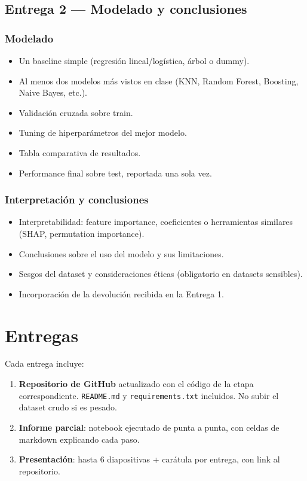 \documentclass[12pt]{article}
\begin{document}
\subsection{Entrega 2 --- Modelado y conclusiones}

\subsubsection{Modelado}

\begin{itemize}
    \item Un baseline simple (regresión lineal/logística, árbol o dummy).
    \item Al menos dos modelos más vistos en clase (KNN, Random Forest, Boosting, Naive Bayes, etc.).
    \item Validación cruzada sobre train.
    \item Tuning de hiperparámetros del mejor modelo.
    \item Tabla comparativa de resultados.
    \item Performance final sobre test, reportada una sola vez.
\end{itemize}

\subsubsection{Interpretación y conclusiones}

\begin{itemize}
    \item Interpretabilidad: feature importance, coeficientes o herramientas similares (SHAP, permutation importance).
    \item Conclusiones sobre el uso del modelo y sus limitaciones.
    \item Sesgos del dataset y consideraciones éticas (obligatorio en datasets sensibles).
    \item Incorporación de la devolución recibida en la Entrega 1.
\end{itemize}

\section{Entregas}

Cada entrega incluye:

\begin{enumerate}
    \item \textbf{Repositorio de GitHub} actualizado con el código de la etapa correspondiente. \texttt{README.md} y \texttt{requirements.txt} incluidos. No subir el dataset crudo si es pesado.
    \item \textbf{Informe parcial}: notebook ejecutado de punta a punta, con celdas de markdown explicando cada paso.
    \item \textbf{Presentación}: hasta 6 diapositivas + carátula por entrega, con link al repositorio.
\end{enumerate}
\end{document}
